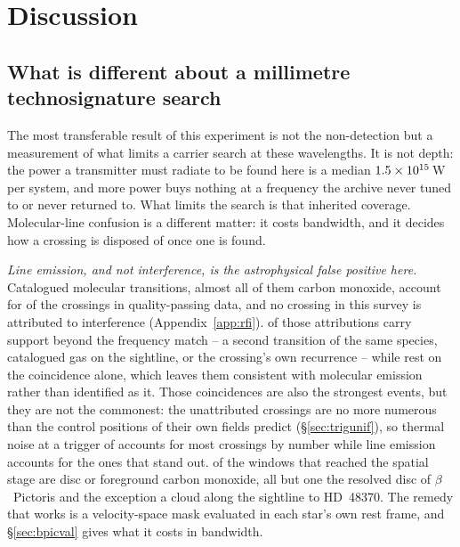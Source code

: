 \section{Discussion}
\label{sec:discussion}

\subsection{What is different about a millimetre technosignature search}
\label{sec:mmdifferent}

The most transferable result of this experiment is not the non-detection but
a measurement of what limits a carrier search at these wavelengths. It is not
depth: the power a transmitter must radiate to be found here is a median
$1.5\times10^{15}$\,W per system, and more power buys nothing at a
frequency the archive never tuned to or never returned to. What limits the
search is that inherited coverage. Molecular-line confusion is a different
matter: it costs bandwidth, and it decides how a crossing is disposed of once
one is found.

\emph{Line emission, and not interference, is the astrophysical false
positive here.}
Catalogued molecular transitions, almost all of them carbon monoxide, account
for \EvNAttrQp{} of the \EvNCrossQp{} crossings in quality-passing data, and
no crossing in this survey is attributed to interference
(Appendix~\ref{app:rfi}). \LnAttrSupp{} of those attributions carry support
beyond the frequency match -- a second transition of the same species,
catalogued gas on the sightline, or the crossing's own recurrence -- while
\LnAttrCoincWord{} rest on the coincidence alone, which leaves them
consistent with molecular emission rather than identified as it. Those coincidences are also the strongest events,
but they are not the commonest: the \EvNUnattrQp{} unattributed crossings are no more
numerous than the control positions of their own fields predict
(\S\ref{sec:trigunif}), so thermal noise at a trigger of \StageNullTrig{}
accounts for most crossings by number while line emission accounts for the
ones that stand out.
\DiscFpWin{} of the \DiscFpOfFlags{} windows that reached the spatial stage
are disc or foreground carbon monoxide, all but one the resolved disc of
$\beta$~Pictoris and the exception a cloud along the sightline to
HD~48370. The remedy that works is a velocity-space mask evaluated in each star's
own rest frame, and \S\ref{sec:bpicval} gives what it costs in
bandwidth.

